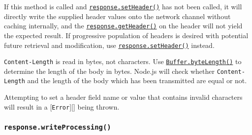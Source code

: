If this method is called and
\hyperref[responsesetheadername-value]{\texttt{response.setHeader()}}
has not been called, it will directly write the supplied header values
onto the network channel without caching internally, and the
\hyperref[responsegetheadername]{\texttt{response.getHeader()}} on the
header will not yield the expected result. If progressive population of
headers is desired with potential future retrieval and modification, use
\hyperref[responsesetheadername-value]{\texttt{response.setHeader()}}
instead.

\begin{Shaded}
\begin{Highlighting}[]
\OperatorTok{=}\OperatorTok{,}\KeywordTok{=\textgreater{}}\NormalTok{ \{}
\NormalTok{(}\OperatorTok{,} \NormalTok{)}\OperatorTok{;}
\NormalTok{(}\OperatorTok{,} \NormalTok{)}\OperatorTok{;}
\NormalTok{(}\OperatorTok{,}\NormalTok{ \{ }\OperatorTok{:} \NormalTok{ \})}\OperatorTok{;}
\NormalTok{(}\NormalTok{)}\OperatorTok{;}
\NormalTok{\})}\OperatorTok{;}
\end{Highlighting}
\end{Shaded}

\texttt{Content-Length} is read in bytes, not characters. Use
\href{buffer.md\#static-method-bufferbytelengthstring-encoding}{\texttt{Buffer.byteLength()}}
to determine the length of the body in bytes. Node.js will check whether
\texttt{Content-Length} and the length of the body which has been
transmitted are equal or not.

Attempting to set a header field name or value that contains invalid
characters will result in a {[}\texttt{Error}{]}{[}{]} being thrown.

\subsubsection{\texorpdfstring{\texttt{response.writeProcessing()}}{response.writeProcessing()}}\label{response.writeprocessing}

